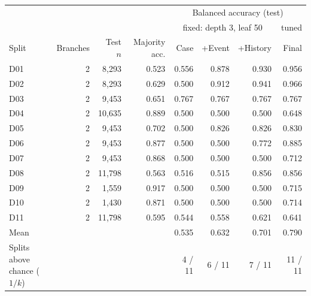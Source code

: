 \begin{tabular}{lrrrrrrr}
\hline
 & & & & \multicolumn{4}{c}{Balanced accuracy (test)} \\
 & & & & \multicolumn{3}{c}{fixed: depth 3, leaf 50} & tuned \\
Split & Branches & Test $n$ & Majority acc. & Case & +Event & +History & Final \\
\hline
D01 & 2 & 8,293 & 0.523 & 0.556 & 0.878 & 0.930 & 0.956 \\
D02 & 2 & 8,293 & 0.629 & 0.500 & 0.912 & 0.941 & 0.966 \\
D03 & 2 & 9,453 & 0.651 & 0.767 & 0.767 & 0.767 & 0.767 \\
D04 & 2 & 10,635 & 0.889 & 0.500 & 0.500 & 0.500 & 0.648 \\
D05 & 2 & 9,453 & 0.702 & 0.500 & 0.826 & 0.826 & 0.830 \\
D06 & 2 & 9,453 & 0.877 & 0.500 & 0.500 & 0.772 & 0.885 \\
D07 & 2 & 9,453 & 0.868 & 0.500 & 0.500 & 0.500 & 0.712 \\
D08 & 2 & 11,798 & 0.563 & 0.516 & 0.515 & 0.856 & 0.856 \\
D09 & 2 & 1,559 & 0.917 & 0.500 & 0.500 & 0.500 & 0.715 \\
D10 & 2 & 1,430 & 0.871 & 0.500 & 0.500 & 0.500 & 0.714 \\
D11 & 2 & 11,798 & 0.595 & 0.544 & 0.558 & 0.621 & 0.641 \\
\hline
Mean & & & & 0.535 & 0.632 & 0.701 & 0.790 \\
Splits above chance ($1/k$) & & & & 4 / 11 & 6 / 11 & 7 / 11 & 11 / 11 \\
\hline
\end{tabular}

